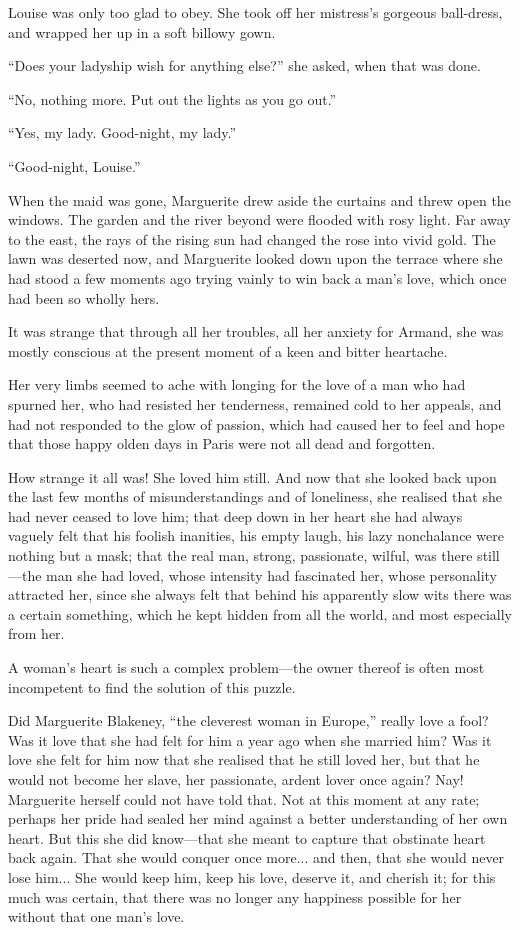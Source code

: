 \documentclass[paper=a5,BCOR=7mm,twoside,DIV=calc,12pt,usegeometry,chapterprefix,endperiod,headings=big]{scrbook}
\begin{document}
Louise was only too glad to obey. She took off her mistress's gorgeous ball-dress, and wrapped her up in a soft billowy gown.

\enquote{Does your ladyship wish for anything else?} she asked, when that was done.

\enquote{No, nothing more. Put out the lights as you go out.}

\enquote{Yes, my lady. Good-night, my lady.}

\enquote{Good-night, Louise.}

When the maid was gone, Marguerite drew aside the curtains and threw open the windows. The garden and the river beyond were flooded with rosy light. Far away to the east, the rays of the rising sun had changed the rose into vivid gold. The lawn was deserted now, and Marguerite looked down upon the terrace where she had stood a few moments ago trying vainly to win back a man's love, which once had been so wholly hers.

It was strange that through all her troubles, all her anxiety for Armand, she was mostly conscious at the present moment of a keen and bitter heartache.

Her very limbs seemed to ache with longing for the love of a man who had spurned her, who had resisted her tenderness, remained cold to her appeals, and had not responded to the glow of passion, which had caused her to feel and hope that those happy olden days in Paris were not all dead and forgotten.

How strange it all was! She loved him still. And now that she looked back upon the last few months of misunderstandings and of loneliness, she realised that she had never ceased to love him; that deep down in her heart she had always vaguely felt that his foolish inanities, his empty laugh, his lazy nonchalance were nothing but a mask; that the real man, strong, passionate, wilful, was there still---the man she had loved, whose intensity had fascinated her, whose personality attracted her, since she always felt that behind his apparently slow wits there was a certain something, which he kept hidden from all the world, and most especially from her.

A woman's heart is such a complex problem---the owner thereof is often most incompetent to find the solution of this puzzle.

Did Marguerite Blakeney, \enquote{the cleverest woman in Europe,} really love a fool? Was it love that she had felt for him a year ago when she married him? Was it love she felt for him now that she realised that he still loved her, but that he would not become her slave, her passionate, ardent lover once again? Nay! Marguerite herself could not have told that. Not at this moment at any rate; perhaps her pride had sealed her mind against a better understanding of her own heart. But this she did know---that she meant to capture that obstinate heart back again. That she would conquer once more... and then, that she would never lose him... She would keep him, keep his love, deserve it, and cherish it; for this much was certain, that there was no longer any happiness possible for her without that one man's love.
\end{document}
